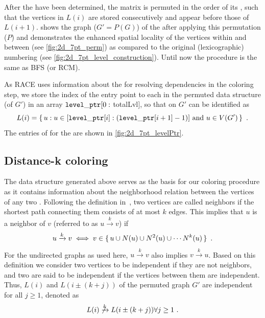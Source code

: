 
After the \levels have been determined, the matrix is permuted in the
order of its \levels, such that the vertices in $L(i)$ are stored
consecutively and appear before those of
$L(i+1)$.  shows the graph ($G' = P(G)$)
of the \stex after applying this permutation ($P$) and demonstrates
the enhanced spatial locality of the vertices within and between
\levels (see \cref{fig:2d_7pt_perm}) as compared to the original
(lexicographic) numbering (see \cref{fig:2d_7pt_level_construction}).
Until now the procedure is the same as \acrshort{BFS} (or
\acrshort{RCM}).

As \acrshort{RACE} uses information about the \levels for resolving
dependencies in the coloring step, we store the index of the entry point to each
\level in the permuted data structure (of $G'$) in an array
${\tt level\_ptr}[0:$ \acrshort{totalLvl}$]$, so that \levels on $G'$ can be
identified as
\begin{equation*}
  L(i) = \set{ u : u \in [{\tt level\_ptr} [i]:({\tt level\_ptr} [i+1]-1)]
    \text{ and } u \in V(G')}~.
\end{equation*}
The entries of \levelPtr for the \stex are shown in \cref{fig:2d_7pt_levelPtr}. 
 
\subsection{Distance-k coloring} \label{subsec:DK}

The data structure generated above serves as the basis for our \DK coloring
procedure as it contains information about the neighborhood relation
between the vertices of any two \levels. Following the definition
in~\cite{dist_k_def}, two vertices are called \DK neighbors if the
shortest path connecting them consists of at most $k$ edges.
This implies that $u$ is a \DK neighbor of $v$ (referred to as
$u\xrightarrow{k}v$) if
\begin{equation}\label{eq:dk}
  u\xrightarrow{k}v  \iff  v \in \set{ u \cup N(u) \cup N^2(u) \cup \cdots N^k(u) }\eos
\end{equation}
For the undirected graphs as used here, $u\xrightarrow{k}v$
also implies $v\xrightarrow{k}u$. Based on this definition we consider
two vertices to be \DK independent if they are not \DK
neighbors, and two \levels are said to be \DK independent if the vertices between them are \DK independent. Thus, \levels $L(i)$ and $L(i\pm(k+j))$ of the permuted
graph $G'$ are \DK independent for all $j\geq1$, denoted as
\begin{equation}\label{corollary_dk}
	L(i) \not\xrightarrow{k} L(i\pm(k+j)) \forall j\geq1 \eos
\end{equation} 

